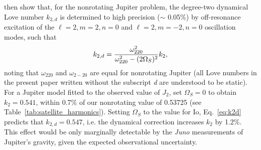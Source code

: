 \citet{vorontsov1984} then show that, for the nonrotating Jupiter problem, the
degree-two dynamical Love number $k_{2,d}$ is determined to high precision ($\sim$
0.05\%) by off-resonance excitation of the $\ell=2, m=2, n=0$ and $\ell=2, m=-2, n=0$
oscillation modes, such that
%
\begin{equation}
    k_{2,d}={{\omega^2_{220}} \over {\omega^2_{220} - (2 \Omega_S)^2}} k_2,
\label{eq:k2d}
\end{equation}
%
noting that $\omega_{220}$ and $\omega_{2-20}$ are equal for nonrotating Jupiter (all
Love numbers in the present paper written without the subscript {\it d} are
understood to be static).  For a Jupiter model fitted to the observed value of $J_2$,
\citet{vorontsov1984} set $\Omega_S = 0$ to obtain $k_2  = 0.541$, within 0.7\% of
our nonrotating value of 0.53725 (see Table~\ref{tab:satellite_harmonics}).  Setting
$\Omega_S$ to the value for Io, Eq.~\ref{eq:k2d} predicts that $k_{2,d} = 0.547$,
i.e. the dynamical correction increases $k_2$ by 1.2\%.  This effect would be only
marginally detectable by the \textit{Juno} measurements of Jupiter's gravity, given
the expected observational uncertainty.


